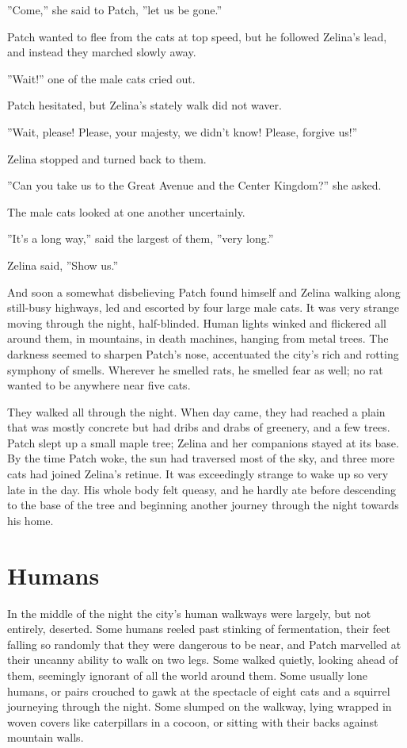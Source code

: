 \documentclass[12pt]{book}
\begin{document}
''Come,'' she said to Patch, ''let us be gone.''

Patch wanted to flee from the cats at top speed, but he followed Zelina's lead, and instead they marched slowly away.

''Wait!'' one of the male cats cried out.

Patch hesitated, but Zelina's stately walk did not waver.

''Wait, please! Please, your majesty, we didn't know! Please, forgive us!''

Zelina stopped and turned back to them.

''Can you take us to the Great Avenue and the Center Kingdom?'' she asked.

The male cats looked at one another uncertainly.

''It's a long way,'' said the largest of them, ''very long.''

Zelina said, ''Show us.''

And soon a somewhat disbelieving Patch found himself and Zelina walking along still-busy highways, led and escorted by four large male cats. It was very strange moving through the night, half-blinded. Human lights winked and flickered all around them, in mountains, in death machines, hanging from metal trees. The darkness seemed to sharpen Patch's nose, accentuated the city's rich and rotting symphony of smells. Wherever he smelled rats, he smelled fear as well; no rat wanted to be anywhere near five cats.

They walked all through the night. When day came, they had reached a plain that was mostly concrete but had dribs and drabs of greenery, and a few trees. Patch slept up a small maple tree; Zelina and her companions stayed at its base. By the time Patch woke, the sun had traversed most of the sky, and three more cats had joined Zelina's retinue. It was exceedingly strange to wake up so very late in the day. His whole body felt queasy, and he hardly ate before descending to the base of the tree and beginning another journey through the night towards his home.


\section{Humans}

In the middle of the night the city's human walkways were largely, but not entirely, deserted. Some humans reeled past stinking of fermentation, their feet falling so randomly that they were dangerous to be near, and Patch marvelled at their uncanny ability to walk on two legs. Some walked quietly, looking ahead of them, seemingly ignorant of all the world around them. Some %
usually lone humans, or pairs %
crouched to gawk at the spectacle of eight cats and a squirrel journeying through the night. Some slumped on the walkway, lying wrapped in woven covers like caterpillars in a cocoon, or sitting with their backs against mountain walls.
\end{document}
